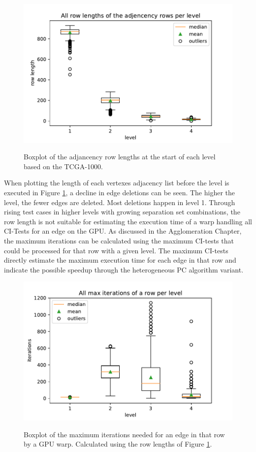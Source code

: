 \begin{figure}[H]
  \caption{Boxplot of the adjancency row lengths at the start of each level based on the TCGA-1000.}
  \includegraphics[width=\textwidth]{figures/rowlength_bxplt.pdf}
  \centering
  \label{fig:rowlength_bxplt}
\end{figure}

When plotting the length of each vertexes adjacency list before the level is executed in Figure \ref{fig:rowlength_bxplt}, a decline in edge deletions can be seen. The higher the level, the fewer edges are deleted. Most deletions happen in level 1. Through rising test cases in higher levels with growing separation set combinations, the row length is not suitable for estimating the execution time of a warp handling all CI-Tests for an edge on the GPU. As discussed in the Agglomeration Chapter, the maximum iterations can be calculated using the maximum CI-tests that could be processed for that row with a given level. The maximum CI-tests directly estimate the maximum execution time for each edge in that row and indicate the possible speedup through the heterogeneous PC algorithm variant.

\begin{figure}[H]
  \caption{Boxplot of the maximum iterations needed for an edge in that row by a GPU warp. Calculated using the row lengths of Figure \ref{fig:rowlength_bxplt}.}
  \includegraphics[width=\textwidth]{figures/iterations_bxplt.pdf}
  \centering
  \label{fig:iterations_bxplt}
\end{figure}

